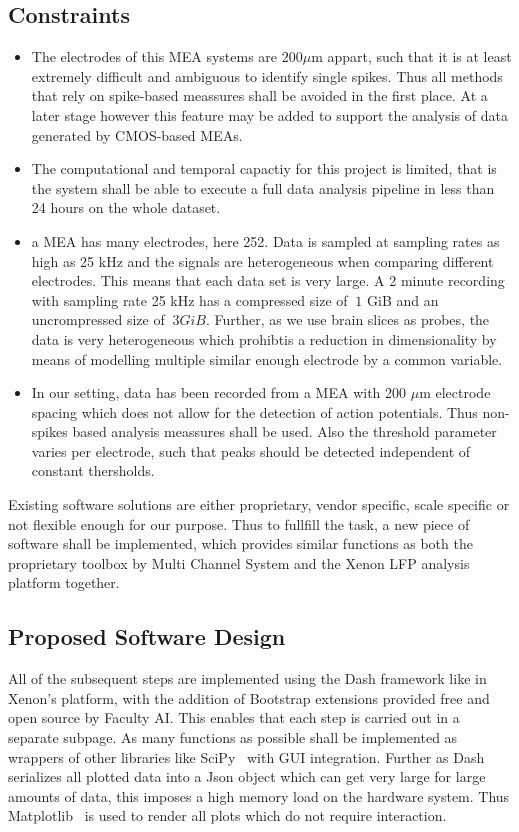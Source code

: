 \documentclass[11pt, twocolumn]{article}
\begin{document}
	\subsection{Constraints}
		\begin{itemize}
			\item The electrodes of this MEA systems are $200\mu$m appart, such that it is at least extremely difficult and ambiguous to identify single spikes.
			Thus all methods that rely on spike-based meassures shall be avoided in the first place.
			At a later stage however this feature may be added to support the analysis of data generated by CMOS-based MEAs.
			\item The computational and temporal capactiy for this project is limited, that is the system shall be able to execute a full data analysis pipeline in less than 24 hours on the whole dataset.
            \item a MEA has many electrodes, here 252. Data is sampled at sampling rates as high as 25 kHz and the signals are heterogeneous when comparing different electrodes. This means that each data set is very large. A 2 minute recording with sampling rate 25 kHz has a compressed size of $~1$ GiB and an uncrompressed size of $~3GiB$.
            Further, as we use brain slices as probes, the data is very heterogeneous which prohibtis a reduction in dimensionality by means of modelling multiple similar enough electrode by a common variable.
            \item 	In our setting, data has been recorded from a MEA with 200 $\mu$m electrode spacing which does not allow for the detection of action potentials.
			Thus non-spikes based analysis meassures shall be used.
			Also the threshold parameter varies per electrode, such that peaks should be detected independent of constant thersholds. \\
		\end{itemize}

		Existing software solutions are either proprietary, vendor specific, scale specific or not flexible enough for our purpose. Thus to fullfill the task, a new piece of software shall be implemented, which provides similar functions as both the proprietary toolbox by Multi Channel System and the Xenon LFP analysis platform together.

	\subsection{Proposed Software Design}
		All of the subsequent steps are implemented using the Dash framework like in Xenon's platform, with the addition of Bootstrap extensions provided free and open source by Faculty AI.
		This enables that each step is carried out in a separate subpage.
		As many functions as possible shall be implemented as wrappers of other libraries like SciPy~\autocite{2020SciPy-NMeth} with GUI integration.
		Further as Dash serializes all plotted data into a Json object which can get very large for large amounts of data, this imposes a high memory load on the hardware system.
		Thus Matplotlib~\autocite{Hunter:2007} is used to render all plots which do not require interaction. \\
\end{document}
